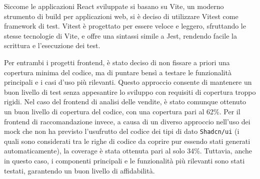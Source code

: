 Siccome le applicazioni React sviluppate si basano su Vite, un moderno strumento di build per applicazioni web, si è deciso di utilizzare Vitest come framework di test. Vitest è progettato per essere veloce e leggero, sfruttando le stesse tecnologie di Vite, e offre una sintassi simile a Jest, rendendo facile la scrittura e l'esecuzione dei test.

Per entrambi i progetti frontend, è stato deciso di non fissare a priori una copertura minima del codice, ma di puntare bensì a testare le funzionalità principali e i casi d'uso più rilevanti. Questo approccio consente di mantenere un buon livello di test senza appesantire lo sviluppo con requisiti di copertura troppo rigidi.
Nel caso del frontend di analisi delle vendite, è stato comunque ottenuto un buon livello di copertura del codice, con una copertura pari al 62\%. Per il frontend di raccomandazione invece, a causa di un diverso approccio nell'uso dei mock che non ha previsto l'usufrutto del codice dei tipi di dato \texttt{Shadcn/ui} (i quali sono considerati tra le righe di codice da coprire pur essendo stati generati automaticamente), la coverage è stata ottenuta pari al solo 34\%. Tuttavia, anche in questo caso, i componenti principali e le funzionalità più rilevanti sono stati testati, garantendo un buon livello di affidabilità.
